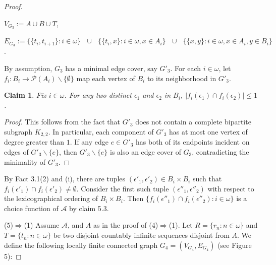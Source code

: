 \documentclass[12pt,reqno,a4paper]{amsart}
\theoremstyle{definition}
\newtheorem{claim}[defn]{Claim}
\begin{document}
\begin{proof}
		\begin{flushleft}
			$V_{G_{3}} := A\cup B\cup T$, 
			
			$E_{G_{3}} := \bigg\{\{t_{i}, t_{i+1}\}:{i\in\omega}\bigg\} 
			\text{ }\cup  \text{ }
			\bigg\{\{t_{i}, x\}: i\in\omega,x\in A_{i}\bigg\}
			\text{ }\cup \text{ }
			\bigg\{\{x,y\}:i\in \omega, x\in A_{i},y\in B_{i}\bigg\}$.
		\end{flushleft}
		
		By assumption, $G_{3}$ has a minimal edge cover, say $G'_{3}$.
		For each $i \in \omega$, let $f_{i}: B_{i} \rightarrow \mathcal{P}(A_{i})\backslash\{\emptyset\}$ map each vertex of $B_{i}$ to its neighborhood in $G'_{3}$. 
		
		\begin{claim}
			{\em Fix $i\in\omega$. For any two distinct $\epsilon_{1}$ and $\epsilon_{2}$ in $B_{i}$, $\vert f_{i}(\epsilon_{1})\cap f_{i}(\epsilon_{2})\vert \leq 1$. } 
		\end{claim}
		\begin{proof}
			This follows from the fact that $G'_{3}$ does not contain 
			a complete bipartite subgraph $K_{2,2}$. In particular, each component of $G'_{3}$ has at most one vertex of degree greater than $1$.
			If any edge $e\in G'_{3}$ has both of its endpoints incident on edges of $G'_{3} \backslash \{e\}$, then $G'_{3} \backslash \{e\}$ is also an edge
			cover of $G_{3}$, contradicting the minimality of $G'_{3}$.
		\end{proof}
		By Fact 3.1(2) and (i), there are tuples $(\epsilon'_{1}, \epsilon'_{2})\in B_{i}\times B_{i}$ such that $f_{i}(\epsilon'_{1})\cap f_{i}(\epsilon'_{2})\neq \emptyset$. Consider the first such tuple $(\epsilon''_{1},\epsilon''_{2})$ with respect to the lexicographical ordering of $B_{i}\times B_{i}$. Then $\{f_{i}(\epsilon''_{1})\cap f_{i}(\epsilon''_{2}): i\in \omega\}$ is a choice function of $\mathcal{A}$ by claim 5.3.
		
		(5)$\Rightarrow$(1) Assume $\mathcal{A}$, and $A$ as in the proof of (4)$\Rightarrow$(1). Let $R=\{r_{n}:n\in \omega\}$ and $T=\{t_{n}:n\in \omega\}$ be two disjoint countably infinite sequences disjoint from $A$.
		We define the following locally finite connected graph $G_{4}=(V_{G_{4}},E_{G_{4}})$ (see Figure 5):
		

\end{proof}
\end{document}
